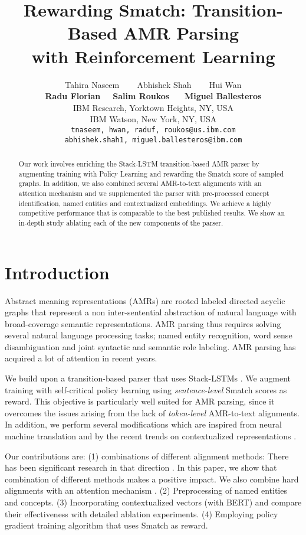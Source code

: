 \documentclass[11pt,a4paper]{article}
\title{Rewarding Smatch: Transition-Based AMR Parsing \\with Reinforcement Learning}
\author{Tahira Naseem ~~~ Abhishek Shah ~~~ Hui Wan \\ \textbf{Radu Florian}~~~\textbf{Salim Roukos} ~~~\textbf{Miguel Ballesteros} \\
  IBM Research,
  Yorktown Heights, NY, USA \\
  IBM Watson, New York, NY, USA \\
  {\tt tnaseem, hwan, raduf, roukos@us.ibm.com} \\ {\tt abhishek.shah1, miguel.ballesteros@ibm.com} }
\date{}
\begin{document}
\maketitle
\begin{abstract}





Our work involves enriching the Stack-LSTM transition-based AMR parser \cite{D17-1130} by  augmenting training with Policy Learning and rewarding the Smatch score of sampled graphs. In addition, we also combined several AMR-to-text alignments with an attention mechanism and we supplemented the parser with pre-processed concept identification, named entities and contextualized embeddings. We achieve a highly competitive performance that is comparable to the best published results. We show an in-depth study ablating each of the new components of the parser.

\end{abstract}

\section{Introduction}

Abstract meaning representations (AMRs) \cite{banarescu} are rooted labeled directed acyclic graphs that represent a non inter-sentential abstraction of natural language with broad-coverage semantic representations. AMR parsing thus requires solving several natural language processing tasks; named entity recognition, word sense disambiguation and joint syntactic and semantic role labeling. AMR parsing has acquired a lot of attention  \cite{WangXP15,zhou2,wangxuepradhan,goodman,D18-1198,lyu2018amr,N18-2023,zhang2019amr} in recent years.



We build upon a transition-based parser \cite{D17-1130} that uses Stack-LSTMs \cite{dyer15}. We augment training with self-critical policy learning \cite{rennie2017self} using \emph{sentence-level} Smatch scores \cite{cai2013smatch} as reward. This objective is particularly well suited for AMR parsing, since it overcomes the issues arising from the lack of \emph{token-level} AMR-to-text alignments. In addition, we perform several modifications which are inspired from neural machine translation \cite{bahdanau2014neural} and by the recent trends on contextualized representations \cite{peters2018deep,devlin2018bert}. 

Our contributions are: (1) combinations of different alignment methods: There has been significant research in that direction \cite{flanigan2014discriminative,pourdamghani2014aligning,Chen2015LearningTM,ChuK16,E17-1053,N18-1106,D18-1264}. In this paper, we show that combination of different methods makes a positive impact. We also combine hard alignments with an attention mechanism \cite{bahdanau2014neural}. (2) Preprocessing of named entities and concepts. (3) Incorporating contextualized vectors (with BERT) and compare their effectiveness with detailed ablation experiments. (4) Employing policy gradient training algorithm that uses Smatch as reward. 
\end{document}
